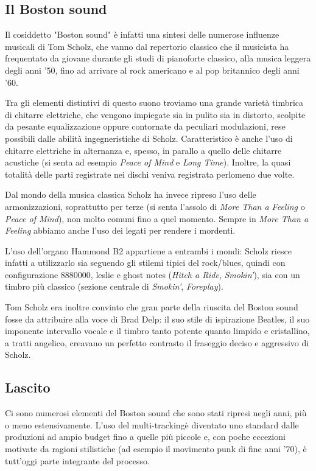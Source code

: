 \documentclass[class=book, crop=false, oneside, 12pt]{standalone}
\begin{document}
\subsection{Il Boston sound}
Il cosiddetto "Boston sound" è infatti una sintesi delle numerose influenze musicali di Tom Scholz, che vanno dal repertorio classico che il musicista ha frequentato da giovane durante gli studi di pianoforte classico, alla musica leggera degli anni '50, fino ad arrivare al rock americano e al pop britannico degli anni '60.

Tra gli elementi distintivi di questo suono troviamo una grande varietà timbrica di chitarre elettriche, che vengono impiegate sia in pulito sia in distorto, scolpite da pesante equalizzazione oppure contornate da peculiari modulazioni, rese possibili dalle abilità ingegneristiche di Scholz. Caratteristico è anche l'uso di chitarre elettriche in alternanza e, spesso, in parallo a quello delle chitarre acustiche (si senta ad esempio \emph{Peace of Mind} e \emph{Long Time}). Inoltre, la quasi totalità delle parti registrate nei dischi veniva registrata perlomeno due volte.

Dal mondo della musica classica Scholz ha invece ripreso l'uso delle armonizzazioni, soprattutto per terze (si senta l'assolo di \emph{More Than a Feeling} o \emph{Peace of Mind}), non molto comuni fino a quel momento. Sempre in \emph{More Than a Feeling}  abbiamo anche l'uso dei legati per rendere i mordenti. 

L'uso dell'organo Hammond B2 appartiene a entrambi i mondi: Scholz riesce infatti a utilizzarlo sia seguendo gli stilemi tipici del rock/blues, quindi con configurazione \(8880000\), leslie e ghost notes (\emph{Hitch a Ride}, \emph{Smokin'}), sia con un timbro più classico (sezione centrale di \emph{Smokin'}, \emph{Foreplay}). 

Tom Scholz era inoltre convinto che gran parte della riuscita del Boston sound fosse da attribuire alla voce di Brad Delp\cite{wiki:bost_b}: il suo stile di ispirazione Beatles, il suo imponente intervallo vocale e il timbro tanto potente quanto limpido e cristallino, a tratti angelico, creavano un perfetto contrasto il fraseggio deciso e aggressivo di Scholz.

\subsection{Lascito}
Ci sono numerosi elementi del Boston sound che sono stati ripresi negli anni, più o meno estensivamente. L'uso del multi-trackingè diventato uno standard dalle produzioni ad ampio budget fino a quelle più piccole e, con poche eccezioni motivate da ragioni stilistiche (ad esempio il movimento punk di fine anni '70), è tutt'oggi parte integrante del processo.
\end{document}

